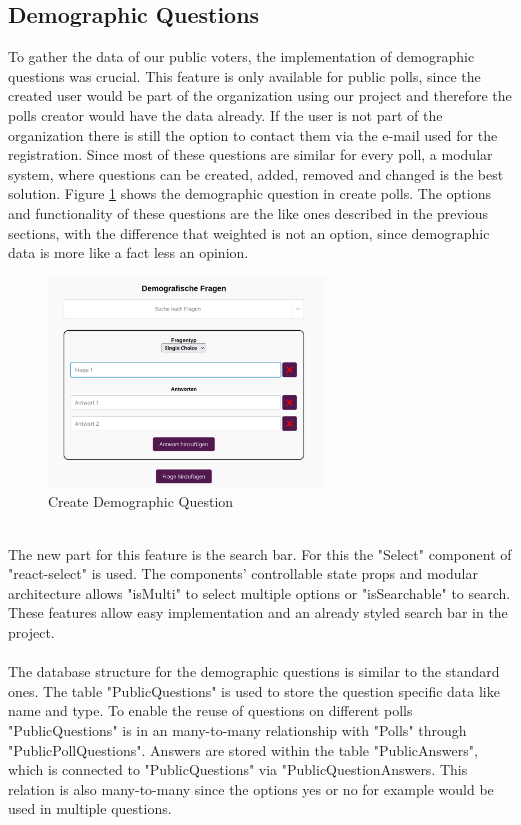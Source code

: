 \documentclass[a4paper,12pt]{report}
\begin{document}
\subsection{Demographic Questions}
To gather the data of our public voters, the implementation of demographic questions was crucial. This feature is only available for public polls, since the created user would be part of the organization using our project and therefore the polls creator would have the data already. If the user is not part of the organization there is still the option to contact them via the e-mail used for the registration. Since most of these questions are similar for every poll, a modular system, where questions can be created, added, removed and changed is the best solution. Figure \ref{fig:create_dem_que} shows the demographic question in create polls. The options and functionality of these questions are the like ones described in the previous sections, with the difference that weighted is not an option, since demographic data is more like a fact less an opinion.
\begin{figure}[h!]
	\centering
	\includegraphics[width=0.65\textwidth]{pics/demographic_question_create.jpg}
	\caption{Create Demographic Question}
	\label{fig:create_dem_que}
\end{figure}
\\
The new part for this feature is the search bar. For this the "Select" component of "react-select" is used. The components' controllable state props and modular architecture allows  "isMulti" to select multiple options or "isSearchable" to search. These features allow easy implementation and an already styled search bar in the project. \parencite{reactselect}
\\ \\
The database structure for the demographic questions is similar to the standard ones. The table "PublicQuestions" is used to store the question specific data like name and type. To enable the reuse of questions on different polls "PublicQuestions" is in an many-to-many relationship with "Polls" through "PublicPollQuestions". Answers are stored within the table "PublicAnswers", which is connected to "PublicQuestions" via "PublicQuestionAnswers. This relation is also many-to-many since the options yes or no for example would be used in multiple questions. 
\end{document}
